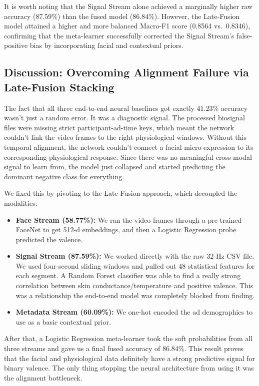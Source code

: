 \documentclass[12pt, a4paper]{article}
\begin{document}
\FloatBarrier

It is worth noting that the Signal Stream alone achieved a marginally higher raw accuracy (87.59\%) than the fused model (86.84\%). However, the Late-Fusion model attained a higher and more balanced Macro-F1 score (0.8564 vs.\ 0.8346), confirming that the meta-learner successfully corrected the Signal Stream's false-positive bias by incorporating facial and contextual priors.

\subsection{Discussion: Overcoming Alignment Failure via Late-Fusion Stacking}
\label{sec:collapse}

The fact that all three end-to-end neural baselines got exactly 41.23\% accuracy wasn't just a random error. It was a diagnostic signal. The processed biosignal files were missing strict participant-ad-time keys, which meant the network couldn't link the video frames to the right physiological windows. Without this temporal alignment, the network couldn't connect a facial micro-expression to its corresponding physiological response. Since there was no meaningful cross-modal signal to learn from, the model just collapsed and started predicting the dominant negative class for everything.

We fixed this by pivoting to the Late-Fusion approach, which decoupled the modalities:

\begin{itemize}
    \item \textbf{Face Stream (58.77\%):} We ran the video frames through a pre-trained FaceNet to get 512-d embeddings, and then a Logistic Regression probe predicted the valence.
    \item \textbf{Signal Stream (87.59\%):} We worked directly with the raw 32-Hz CSV file. We used four-second sliding windows and pulled out 48 statistical features for each segment. A Random Forest classifier was able to find a really strong correlation between skin conductance/temperature and positive valence. This was a relationship the end-to-end model was completely blocked from finding.
    \item \textbf{Metadata Stream (60.09\%):} We one-hot encoded the ad demographics to use as a basic contextual prior.
\end{itemize}

After that, a Logistic Regression meta-learner took the soft probabilities from all three streams and gave us a final fused accuracy of 86.84\%. This result proves that the facial and physiological data definitely have a strong predictive signal for binary valence. The only thing stopping the neural architecture from using it was the alignment bottleneck.
\end{document}
